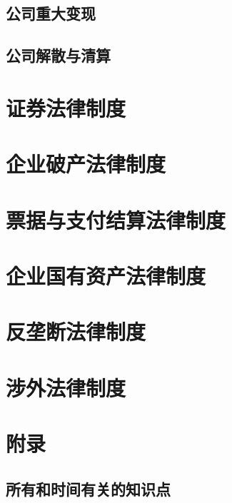 \documentclass[UTF8,12pt]{ctexart}
\numberwithin{equation}{section} %
\numberwithin{figure}{section}
\numberwithin{table}{section}
\begin{document}
	\subsection{公司重大变现}
	
	\subsection{公司解散与清算}
	
	\newpage
	\section{证券法律制度}
	
	\newpage
	\section{企业破产法律制度}
	
	\newpage
	\section{票据与支付结算法律制度}
	
	\newpage
	\section{企业国有资产法律制度}
	
	\newpage
	\section{反垄断法律制度}
	
	\newpage
	\section{涉外法律制度}
	
	\newpage
	\section{附录}
	\subsection{所有和时间有关的知识点}
	
\end{document}
